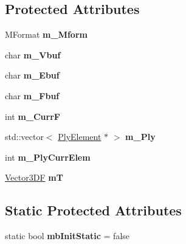 \subsection*{Protected Attributes}
\begin{DoxyCompactItemize}
\item 
\hypertarget{class_mesh_a73b7538adb68454a0dabd27711ecd133}{M\+Format {\bfseries m\+\_\+\+Mform}}\label{class_mesh_a73b7538adb68454a0dabd27711ecd133}

\item 
\hypertarget{class_mesh_a0f5731786259f7b638d997dd5390b278}{char {\bfseries m\+\_\+\+Vbuf}}\label{class_mesh_a0f5731786259f7b638d997dd5390b278}

\item 
\hypertarget{class_mesh_a1549447b68fd12fe83622812b70aad94}{char {\bfseries m\+\_\+\+Ebuf}}\label{class_mesh_a1549447b68fd12fe83622812b70aad94}

\item 
\hypertarget{class_mesh_a5c52a14b1f580c409f3f99b30f272fa5}{char {\bfseries m\+\_\+\+Fbuf}}\label{class_mesh_a5c52a14b1f580c409f3f99b30f272fa5}

\item 
\hypertarget{class_mesh_a30b419e806fb12f85a1e5bf3fe56b048}{int {\bfseries m\+\_\+\+Curr\+F}}\label{class_mesh_a30b419e806fb12f85a1e5bf3fe56b048}

\item 
\hypertarget{class_mesh_a10b9cca68f1335477490a3786380ca56}{std\+::vector$<$ \hyperlink{struct_ply_element}{Ply\+Element} $\ast$ $>$ {\bfseries m\+\_\+\+Ply}}\label{class_mesh_a10b9cca68f1335477490a3786380ca56}

\item 
\hypertarget{class_mesh_a834ba6b3959c7eefd33ff21f9ab860d3}{int {\bfseries m\+\_\+\+Ply\+Curr\+Elem}}\label{class_mesh_a834ba6b3959c7eefd33ff21f9ab860d3}

\item 
\hypertarget{class_mesh_ad6fab05acf807dea880ab00a4a28a4c7}{\hyperlink{class_vector3_d_f}{Vector3\+D\+F} {\bfseries m\+T}}\label{class_mesh_ad6fab05acf807dea880ab00a4a28a4c7}

\end{DoxyCompactItemize}
\subsection*{Static Protected Attributes}
\begin{DoxyCompactItemize}
\item 
\hypertarget{class_mesh_a3b8923f3ecd0b1ab392e1487d83f7a5d}{static bool {\bfseries mb\+Init\+Static} = false}\label{class_mesh_a3b8923f3ecd0b1ab392e1487d83f7a5d}

\end{DoxyCompactItemize}
